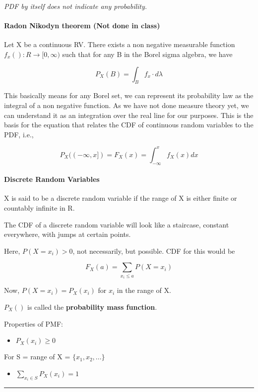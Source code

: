 \emph{PDF by itself does not indicate any probability.}

\hypertarget{radon-nikodyn-theorem-not-done-in-class}{%
\paragraph{Radon Nikodyn theorem (Not done in
class)}\label{radon-nikodyn-theorem-not-done-in-class}}

Let X be a continuous RV. There exists a non negative measurable
function \(f_x() : R \to [0, \infty)\) such that for any B in the Borel
sigma algebra, we have

\[P_X(B) = \displaystyle\int_{B} f_x\cdot d\lambda\]

This basically means for any Borel set, we can represent its probability
law as the integral of a non negative function. As we have not done
measure theory yet, we can understand it as an integration over the real
line for our purposes. This is the basis for the equation that relates
the CDF of continuous random variables to the PDF, i.e.,

\[P_X((-\infty, x]) = F_X(x) = \displaystyle\int_{-\infty}^{x} f_X(x) dx\]

\hypertarget{discrete-random-variables}{%
\paragraph{Discrete Random Variables}\label{discrete-random-variables}}

X is said to be a discrete random variable if the range of X is either
finite or countably infinite in R.

The CDF of a discrete random variable will look like a staircase,
constant everywhere, with jumps at certain points.

Here, \(P(X = x_i) > 0\), not necessarily, but possible. CDF for this
would be

\[F_X(a) = \displaystyle\sum_{x_i \leq a} P(X = x_i)\]

Now, \(P(X = x_i) = P_X(x_i)\) for \(x_i\) in the range of X.

\(P_X()\) is called the \textbf{probability mass function}.

Properties of PMF:

\begin{itemize}
\tightlist
\item
  \(P_X(x_i) \geq 0\)
\end{itemize}

For S = range of X = \(\{x_1, x_2, ...\}\)

\begin{itemize}
\tightlist
\item
  \(\displaystyle\sum_{x_i \in S} P_X(x_i) = 1\)
\end{itemize}

\begin{center}\rule{0.5\linewidth}{0.5pt}\end{center}
